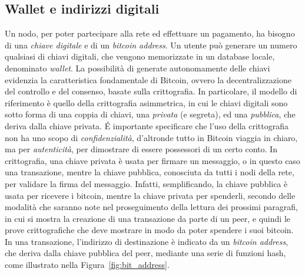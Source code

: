 \subsection{Wallet e indirizzi digitali}
Un nodo, per poter partecipare alla rete ed effettuare un pagamento, ha bisogno di una \emph{chiave digitale} e di un \emph{bitcoin address}. Un utente può generare un numero qualsiasi di chiavi digitali, che vengono memorizzate in un database locale, denominato \emph{wallet}.
La possibilità di generate autonomamente delle chiavi evidenzia la caratteristica fondamentale di Bitcoin, ovvero la decentralizzazione del controllo e del consenso, basate sulla crittografia.
In particolare, il modello di riferimento è quello della crittografia asimmetrica, in cui le chiavi digitali sono sotto forma di una coppia di chiavi, una \emph{privata} (e segreta), ed una \emph{pubblica}, che deriva dalla chiave privata. \'E importante specificare che l'uso della crittografia non ha uno scopo di \emph{confidenzialità}, d'altronde tutto in Bitcoin viaggia in chiaro, ma per \emph{autenticità}, per dimostrare di essere possessori di un certo conto.
In crittografia, una chiave privata è usata per firmare un messaggio, o in questo caso una transazione, mentre la chiave pubblica, conosciuta da tutti i nodi della rete, per validare la firma del messaggio. Infatti, semplificando, la chiave pubblica è usata per ricevere i bitcoin, mentre la chiave privata per spenderli, secondo delle modalità che saranno note nel proseguimento della lettura dei prossimi paragrafi, in cui si mostra la creazione di una transazione da parte di un peer, e quindi le prove crittografiche che deve mostrare in modo da poter spendere i suoi bitcoin.
In una transazione, l'indirizzo di destinazione è indicato da un \emph{bitcoin address}, che deriva dalla chiave pubblica del peer, mediante una serie di funzioni hash, come illustrato nella Figura~\ref{fig:bit_address}.

